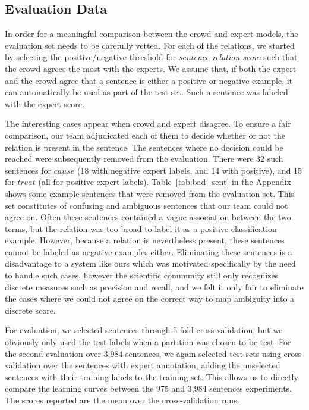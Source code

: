 \subsection{Evaluation Data}

In order for a meaningful comparison between the crowd and expert models, the evaluation set needs to be carefully vetted. For each of the relations, we started by selecting the positive/negative threshold for \textit{sentence-relation score} such that the crowd agrees the most with the experts. We assume that, if both the expert and the crowd agree that a sentence is either a positive or negative example, it can automatically be used as part of the test set. Such a sentence was labeled with the expert score.

The interesting cases appear when crowd and expert disagree. To ensure a fair comparison, our team adjudicated each of them to decide whether or not the relation is present in the sentence. The sentences where no decision could be reached were subsequently removed from the evaluation.  There were 32 such sentences for $cause$ (18 with negative expert labels, and 14 with positive), and 15 for $treat$ (all for positive expert labels).  Table~\ref{tab:bad_sent} in the Appendix shows some example sentences that were removed from the evaluation set.  This set constitutes of confusing and ambiguous sentences that our team could not agree on.  Often these sentences contained a vague association between the two terms, but the relation was too broad to label it as a positive classification example.  However, because a relation is nevertheless present, these sentences cannot be labeled as negative examples either.  Eliminating these sentences is a disadvantage to a system like ours which was motivated specifically by the need to handle such cases, however the scientific community still only recognizes discrete measures such as precision and recall, and we felt it only fair to eliminate the cases where we could not agree on the correct way to map ambiguity into a discrete score.

For evaluation, we selected sentences through 5-fold cross-validation, but we obviously only used the test labels when a partition was chosen to be test. For the second evaluation over 3,984 sentences, we again selected test sets using cross-validation over the sentences with expert annotation, adding the unselected sentences with their training labels to the training set. This allows us to directly compare the learning curves between the 975 and 3,984 sentences experiments. The scores reported are the mean over the cross-validation runs.

